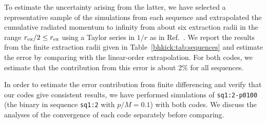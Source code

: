To estimate the uncertainty arising from the latter, we have selected a
representative sample of the simulations from each sequence and extrapolated
the cumulative radiated momentum to infinity from about six extraction
radii in the range $r_{\rm ex}/2 \le r_{\rm ex}$
using a Taylor series in $1/r$ as in
Ref.~\cite{Sperhake:2011zz}. We report the results from the finite
extraction radii given in Table~\ref{bhkick:tab:sequences} and estimate the
error by comparing with the linear-order extrapolation.
For both codes, we estimate that the contribution from this error is about
2\%
for all sequences.

In order to estimate the error contribution from finite differencing and
verify that our codes give consistent results, we have performed simulations
of \texttt{sq1:2-p0100} (the binary in sequence \texttt{sq1:2} with
$p/M = 0.1$) with both codes. We discuss the analyses of the convergence
of each code separately before comparing.

